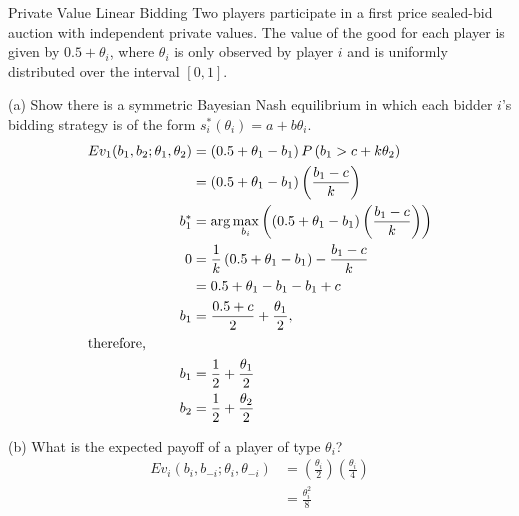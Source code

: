 \documentclass[9pt]{extarticle}
\begin{document}
  \begin{problem}{Private Value Linear Bidding}
    Two players participate in a first price sealed-bid auction with independent private values. The value of the good for each player is given by $0.5 + \theta_i$, where $\theta_i$ is only observed by player $i$ and is uniformly distributed over the interval $[0,1]$.
    \tcblower
    \begin{problem}{(a)}
      Show there is a symmetric Bayesian Nash equilibrium in which each bidder $i$'s bidding strategy is of the form $s_i^*(\theta_i) = a + b\theta_i$.
      \tcblower
      \begin{align*}
        Ev_1(b_1,b_2;\theta_1,\theta_2) &= \left(0.5 + \theta_1 - b_1\right)P\left(b_1 > c + k\theta_{2}\right)\\
                                        &= \left(0.5 + \theta_1 - b_1\right)\left(\frac{b_1 - c}{k}\right)\\
        b_1^* &= \arg\max_{b_i}\left(\left(0.5 + \theta_1 - b_1\right)\left(\frac{b_1 - c}{k}\right)\right)\\
        0 &= \frac{1}{k}\left(0.5 + \theta_1 - b_1\right) - \frac{b_1-c}{k}\\
          &= 0.5 + \theta_1 - b_1 - b_1 + c\\
        b_1 &= \frac{0.5 + c}{2} + \frac{\theta_1}{2},\\
        \shortintertext{therefore,}
        b_1 &= \frac{1}{2} + \frac{\theta_1}{2}\\
        b_2 &= \frac{1}{2} + \frac{\theta_2}{2}
      \end{align*}
    \end{problem}
    \begin{problem}{(b)}
      What is the expected payoff of a player of type $\theta_i$?
      \tcblower
      \begin{align*}
        Ev_{i}(b_i,b_{-i};\theta_i,\theta_{-i}) &= \left(\frac{\theta_i}{2}\right)\left(\frac{\theta_i}{4}\right)\\
                                                &= \frac{\theta_i^2}{8}
      \end{align*}
    \end{problem}
  \end{problem}
\end{document}
